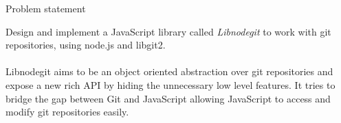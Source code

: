 \begin{center}
  {\huge Problem statement} \\[0.4cm]
\end{center}


Design and implement a JavaScript library called \textit{Libnodegit} to work
with git repositories, using node.js and libgit2. \\ \\

Libnodegit aims to be an object oriented abstraction over git repositories and
expose a new rich API by hiding the unnecessary low level features. It tries to
bridge the gap between Git and JavaScript allowing JavaScript to access and
modify git repositories easily.
